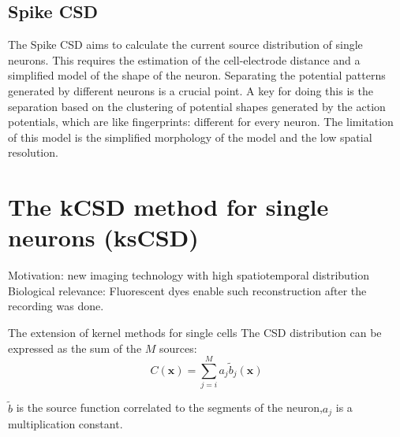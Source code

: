 \documentclass[12pt,a4paper]{article}
\begin{document}
  
\subsection{Spike CSD}
The Spike CSD \cite{Soma} aims to calculate the current source distribution of single neurons. This requires the estimation of the cell-electrode distance and a simplified model of the shape of the neuron. Separating the potential patterns generated by different neurons is a crucial point. A key for doing this is the separation based on the clustering of potential shapes generated by the action potentials, which are like fingerprints: different for every neuron. The limitation of this model is the simplified morphology of the model and the low spatial resolution.

\section{The  kCSD method for single neurons (ksCSD)}
Motivation: new imaging technology with high spatiotemporal distribution
Biological relevance:   Fluorescent dyes enable such reconstruction after the recording was done.



The extension of kernel methods for single cells
The CSD distribution can be expressed as the sum of the $M$ sources: 
\begin{equation}
C (\textbf{x})= \sum_{j=i}^M a_j \tilde{b}_j(\textbf{x})
\end{equation}

$\tilde{b}$ is the source function correlated to the segments of the neuron,$a_j$ is a multiplication constant.




\end{document}
